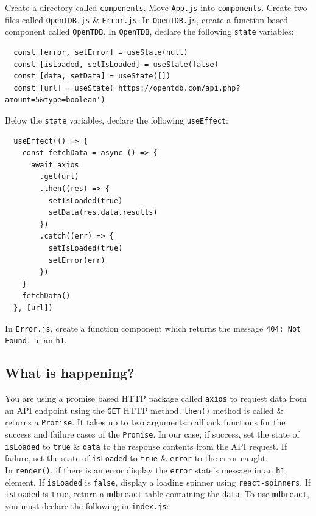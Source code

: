 \documentclass{article}
\begin{document}
Create a directory called \texttt{components}. Move \texttt{App.js} into \texttt{components}. Create two files called \texttt{OpenTDB.js} \& \texttt{Error.js}. In \texttt{OpenTDB.js}, create a function based component called \texttt{OpenTDB}. In \texttt{OpenTDB}, declare the following \texttt{state} variables:
\begin{verbatim}
  const [error, setError] = useState(null)
  const [isLoaded, setIsLoaded] = useState(false)
  const [data, setData] = useState([])
  const [url] = useState('https://opentdb.com/api.php?amount=5&type=boolean')
\end{verbatim}

Below the \texttt{state} variables, declare the following \texttt{useEffect}:
\begin{verbatim}
  useEffect(() => {
    const fetchData = async () => {
      await axios
        .get(url)
        .then((res) => {
          setIsLoaded(true)
          setData(res.data.results)
        })
        .catch((err) => {
          setIsLoaded(true)
          setError(err)
        })
    }
    fetchData()
  }, [url])
\end{verbatim}

In \texttt{Error.js}, create a function component which returns the message \texttt{404: Not Found.} in an \texttt{h1}.

\subsection*{What is happening?} 
You are using a promise based HTTP package called \texttt{axios} to request data from an API endpoint using the \texttt{GET} HTTP method. \texttt{then()} method is called \& returns a \texttt{Promise}. It takes up to two arguments: callback functions for the success and failure cases of the \texttt{Promise}. In our case, if success, set the state of \texttt{isLoaded} to \texttt{true} \& \texttt{data} to the response contents from the API request. If failure, set the state of \texttt{isLoaded} to \texttt{true} \& \texttt{error} to the error caught. \\

In \texttt{render()}, if there is an error display the \texttt{error} state's message in an \texttt{h1} element. If \texttt{isLoaded} is \texttt{false}, display a loading spinner using \texttt{react-spinners}. If \texttt{isLoaded} is \texttt{true}, return a \texttt{mdbreact} table containing the \texttt{data}. To use \texttt{mdbreact}, you must declare the following in \texttt{index.js}:
\end{document}
